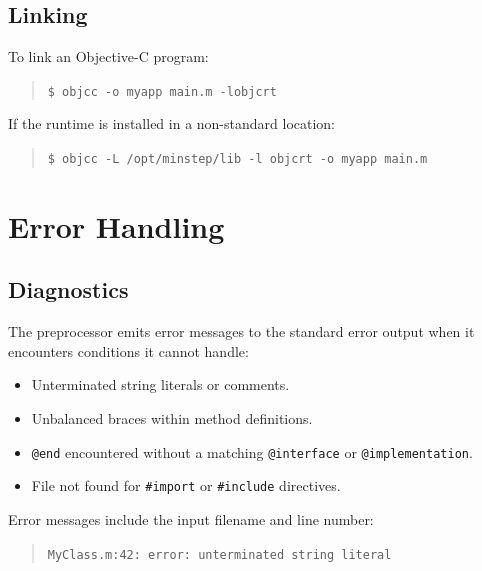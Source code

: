 \documentclass[11pt,twoside]{article}
\begin{document}
\subsection{Linking}

To link an Objective-C program:
\begin{quote}
{\tt \$ objcc -o myapp main.m -lobjcrt}
\end{quote}

If the runtime is installed in a non-standard location:
\begin{quote}
{\tt \$ objcc -L /opt/minstep/lib -l objcrt -o myapp main.m}
\end{quote}

\newpage
\section{Error Handling}

\subsection{Diagnostics}

The preprocessor emits error messages to the standard error output when
it encounters conditions it cannot handle:

\begin{itemize}
  \item Unterminated string literals or comments.
  \item Unbalanced braces within method definitions.
  \item {\tt @end} encountered without a matching {\tt @interface} or
        {\tt @implementation}.
  \item File not found for {\tt \#import} or {\tt \#include} directives.
\end{itemize}

Error messages include the input filename and line number:
\begin{quote}
{\tt MyClass.m:42: error: unterminated string literal}
\end{quote}
\end{document}
